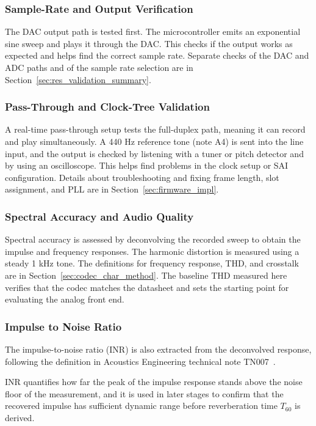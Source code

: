 \subsubsection{Sample-Rate and Output Verification}

The DAC output path is tested first. The microcontroller emits an exponential sine sweep and plays it through the DAC.  This checks if the output works as expected and helps find the correct sample rate. Separate checks of the DAC and ADC paths and of the sample rate selection are in Section~\ref{sec:res_validation_summary}.

\subsubsection{Pass-Through and Clock-Tree Validation}

A real-time pass-through setup tests the full-duplex path, meaning it can record and play simultaneously. A 440 Hz reference tone (note A4) is sent into the line input, and the output is checked by listening with a tuner or pitch detector and by using an oscilloscope. This helps find problems in the clock setup or SAI configuration. Details about troubleshooting and fixing frame length, slot assignment, and PLL are in Section~\ref{sec:firmware_impl}.

\subsubsection{Spectral Accuracy and Audio Quality}

Spectral accuracy is assessed by deconvolving the recorded sweep to obtain the impulse and frequency responses. The harmonic distortion is measured using a steady 1 kHz tone. The definitions for frequency response, THD, and crosstalk are in Section~\ref{sec:codec_char_method}. The baseline THD measured here verifies that the codec matches the datasheet and sets the starting point for evaluating the analog front end.

\subsubsection{Impulse to Noise Ratio}
The impulse-to-noise ratio (INR) is also extracted from the deconvolved response, following the definition in Acoustics Engineering technical note TN007~\cite{IRThesisAndres}.

INR quantifies how far the peak of the impulse response stands above the noise floor of the measurement, and it is used in later stages to confirm that the recovered impulse has sufficient dynamic range before reverberation time $T_{60}$ is derived.

